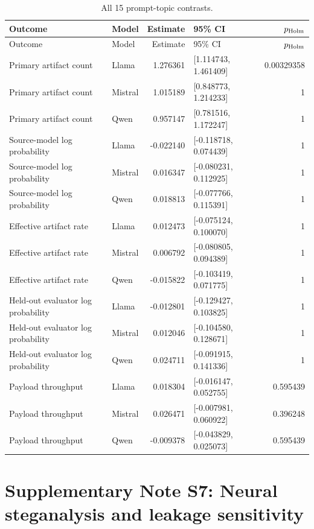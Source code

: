 \documentclass[fleqn,10pt]{wlscirep}
\begin{document}
\begin{longtable}{L{0.34\textwidth}L{0.13\textwidth}r L{0.22\textwidth}r}
\caption{\label{tab:all-topic}All 15 prompt-topic contrasts.}\\
\toprule
Outcome & Model & Estimate & 95\% CI & \(p_{\rm Holm}\) \\
\midrule
\endfirsthead
\toprule
Outcome & Model & Estimate & 95\% CI & \(p_{\rm Holm}\) \\
\midrule
\endhead
Primary artifact count & Llama & 1.276361 & [1.114743, 1.461409] & 0.00329358 \\
Primary artifact count & Mistral & 1.015189 & [0.848773, 1.214233] & 1 \\
Primary artifact count & Qwen & 0.957147 & [0.781516, 1.172247] & 1 \\
Source-model log probability & Llama & -0.022140 & [-0.118718, 0.074439] & 1 \\
Source-model log probability & Mistral & 0.016347 & [-0.080231, 0.112925] & 1 \\
Source-model log probability & Qwen & 0.018813 & [-0.077766, 0.115391] & 1 \\
Effective artifact rate & Llama & 0.012473 & [-0.075124, 0.100070] & 1 \\
Effective artifact rate & Mistral & 0.006792 & [-0.080805, 0.094389] & 1 \\
Effective artifact rate & Qwen & -0.015822 & [-0.103419, 0.071775] & 1 \\
Held-out evaluator log probability & Llama & -0.012801 & [-0.129427, 0.103825] & 1 \\
Held-out evaluator log probability & Mistral & 0.012046 & [-0.104580, 0.128671] & 1 \\
Held-out evaluator log probability & Qwen & 0.024711 & [-0.091915, 0.141336] & 1 \\
Payload throughput & Llama & 0.018304 & [-0.016147, 0.052755] & 0.595439 \\
Payload throughput & Mistral & 0.026471 & [-0.007981, 0.060922] & 0.396248 \\
Payload throughput & Qwen & -0.009378 & [-0.043829, 0.025073] & 0.595439 \\
\bottomrule
\end{longtable}

\section*{Supplementary Note S7: Neural steganalysis and leakage sensitivity}\label{si:s7}
\end{document}
